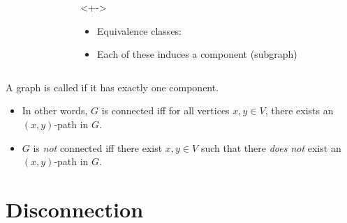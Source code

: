 \documentclass
[ignorenonframetext,aspectratio=169]
{ngelessonslides}
\begin{document}
\begin{frame}[label=cpt-ex]
\begin{columns}
\begin{column}{0.45\textwidth}
\begin{example}
        \end{example}
    \end{column}
    \begin{column}{0.45\textwidth}
        \begin{solution}<+->
            \begin{itemize}
            \item<+-> Equivalence classes:
            \item<+-> Each of these induces a component (subgraph)
            \end{itemize}
        \end{solution}
    \end{column}
    \end{columns}
\end{frame}

\begin{frame}[label=ctd-def]
\begin{definition}[Connected]
    A graph is called  if it has exactly one component.
\end{definition}
\begin{itemize}
    \item In other words, $G$ is connected iff for all vertices $x,y\in V$,
    there exists an $(x,y)$-path in $G$.
    \item $G$ is \emph{not} connected iff there exist $x,y\in V$ such that
    there \emph{does not} exist an $(x,y)$-path in $G$.
\end{itemize}
\end{frame}

\section{Disconnection}
\end{document}

